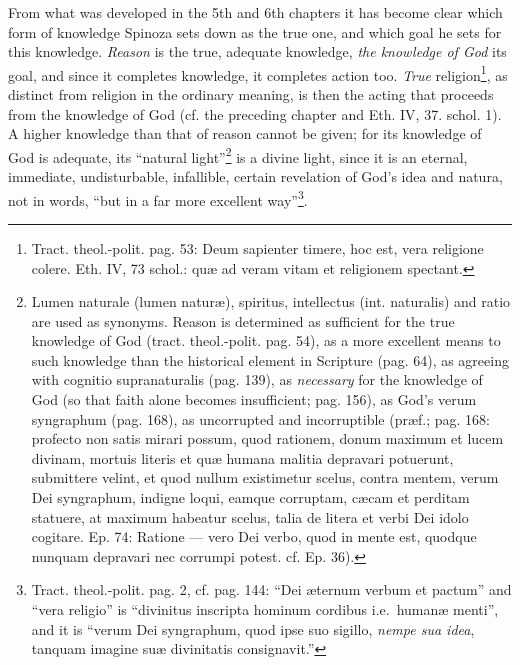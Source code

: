 \documentclass[12pt,a4paper,openany]{book}
\newcommand{\opage}[1]{\marginnote{\footnotesize\textit{[#1]}}}
\begin{document}
From what was developed in the 5th and 6th chapters it has become clear which form of knowledge Spinoza sets down as the true one, and which goal he sets for this knowledge. \emph{Reason} is the true, adequate knowledge, \emph{the knowledge of God} its goal, and since it completes knowledge, it completes action too. \emph{True} religion\footnote{Tract. theol.-polit. pag. 53: Deum sapienter timere, hoc est, vera religione colere. Eth. IV, 73 schol.: quæ ad veram vitam et religionem spectant.}, as distinct from religion in the ordinary meaning, is then the acting that proceeds from the knowledge of God (cf. the preceding chapter and Eth. IV, 37. schol. 1). A higher knowledge than that of reason cannot be given; for its knowledge of God is adequate, its ``natural light''\footnote{Lumen naturale (lumen naturæ), spiritus, intellectus (int. naturalis) and ratio are used as synonyms. Reason is determined as sufficient for the true knowledge of God (tract. theol.-polit. pag. 54), as a more excellent means to such knowledge than the historical element in Scripture (pag. 64), as agreeing with cognitio supranaturalis (pag. 139), as \emph{necessary} for the knowledge of God (so that faith alone becomes insufficient; pag. 156), as God's verum syngraphum (pag. 168), as uncorrupted and incorruptible (præf.; pag. 168: profecto non satis mirari possum, quod rationem, donum maximum et lucem divinam, mortuis literis et quæ humana malitia depravari potuerunt, submittere velint, et quod nullum existimetur scelus, contra mentem, verum Dei syngraphum, indigne loqui, eamque corruptam, cæcam et perditam statuere, at maximum habeatur scelus, talia de litera et verbi Dei idolo cogitare. Ep. 74: Ratione --- vero Dei verbo, quod in mente est, quodque nunquam depravari nec corrumpi potest. cf. Ep. 36).} is a
\opage{148}\setcounter{footnote}{0}divine light, since it is an eternal, immediate, undisturbable, infallible, certain revelation of God's idea and natura, not in words, ``but in a far more excellent way''\footnote{Tract. theol.-polit. pag. 2, cf. pag. 144: ``Dei æternum verbum et pactum'' and ``vera religio'' is ``divinitus inscripta hominum cordibus i.e.\ humanæ menti'', and it is ``verum Dei syngraphum, quod ipse suo sigillo, \emph{nempe sua idea}, tanquam imagine suæ divinitatis consignavit.''}. %
\end{document}
